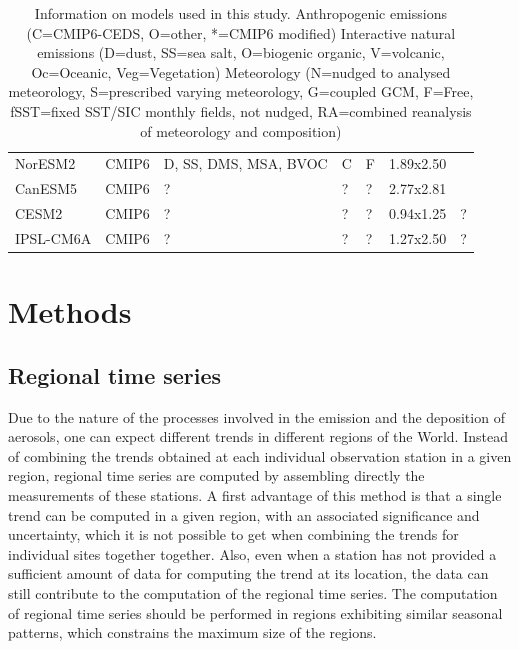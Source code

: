 \documentclass[journal abbreviation, manuscript]{copernicus}
\begin{document}
\begin{table}[]
\begin{tabularx}{\textwidth}{llllllX}
  NorESM2    & CMIP6     & D, SS, DMS, MSA, BVOC      & C                          & F           & 1.89x2.50                  & \cite{olivieprep, selandprep, kirkevag2018production}               \\
  CanESM5    & CMIP6     & ?                          &             ?               & ?           & 2.77x2.81                  & \cite{gmd-12-4823-2019}                                             \\
  CESM2      & CMIP6     & ?                          & ?                          & ?           & 0.94x1.25                  &             ?                                                        \\
  IPSL-CM6A  & CMIP6     & ?                          & ?                          & ?           & 1.27x2.50                  &              ?                                                       \\ \bottomrule
 \end{tabularx}
 \caption{Information on models used in this study.
  Anthropogenic emissions (C=CMIP6-CEDS, O=other, *=CMIP6 modified)
  Interactive natural emissions (D=dust, SS=sea salt, O=biogenic organic, V=volcanic, Oc=Oceanic, Veg=Vegetation)
  Meteorology (N=nudged to analysed meteorology, S=prescribed varying meteorology, G=coupled GCM, F=Free, fSST=fixed SST/SIC monthly fields, not nudged, RA=combined reanalysis of meteorology and composition)
 }
 \label{table:models}
\end{table}

\section{Methods}

\subsection{Regional time series}
Due to the nature of the processes involved in the emission and the deposition of aerosols, one can expect different trends in different regions of the World. Instead of combining the trends obtained at each individual observation station in a given region, regional time series are computed by assembling directly the measurements of these stations. A first advantage of this method is that a single trend can be computed in a given region, with an associated significance and uncertainty, which it is not possible to get when combining the trends for individual sites together together. Also, even when a station has not provided a sufficient amount of data for computing the trend at its location, the data can still contribute to the computation of the regional time series. The computation of regional time series should be performed in regions exhibiting similar seasonal patterns, which constrains the maximum size of the regions.
\end{document}
